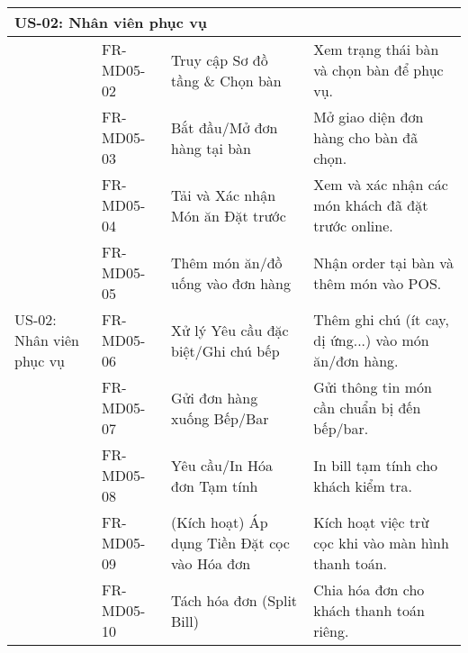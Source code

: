 \begin{longtable}{|m{2.5cm}|m{2.5cm}|m{5cm}|m{5cm}|}
	\multicolumn{4}{|l|}{\textbf{US-02: Nhân viên phục vụ}}                                                                                                                                                                                \\ \hline
	\multirow{12}{=}[2pt]{US-02: Nhân viên phục vụ}         & FR-MD05-02            & Truy cập Sơ đồ tầng \& Chọn bàn                        & Xem trạng thái bàn và chọn bàn để phục vụ.                                                  \\
	                                                        & FR-MD05-03            & Bắt đầu/Mở đơn hàng tại bàn                            & Mở giao diện đơn hàng cho bàn đã chọn.                                                      \\
	                                                        & FR-MD05-04            & Tải và Xác nhận Món ăn Đặt trước                       & Xem và xác nhận các món khách đã đặt trước online.                                          \\
	                                                        & FR-MD05-05            & Thêm món ăn/đồ uống vào đơn hàng                       & Nhận order tại bàn và thêm món vào POS.                                                     \\
	                                                        & FR-MD05-06            & Xử lý Yêu cầu đặc biệt/Ghi chú bếp                     & Thêm ghi chú (ít cay, dị ứng...) vào món ăn/đơn hàng.                                       \\
	                                                        & FR-MD05-07            & Gửi đơn hàng xuống Bếp/Bar                             & Gửi thông tin món cần chuẩn bị đến bếp/bar.                                                 \\
	                                                        & FR-MD05-08            & Yêu cầu/In Hóa đơn Tạm tính                            & In bill tạm tính cho khách kiểm tra.                                                        \\
	                                                        & FR-MD05-09            & (Kích hoạt) Áp dụng Tiền Đặt cọc vào Hóa đơn           & Kích hoạt việc trừ cọc khi vào màn hình thanh toán.                                         \\
	                                                        & FR-MD05-10            & Tách hóa đơn (Split Bill)                              & Chia hóa đơn cho khách thanh toán riêng.                                                    \\

\end{longtable}

